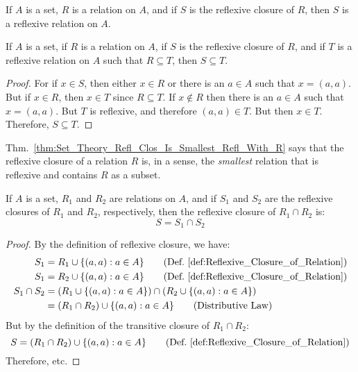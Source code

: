     \begin{theorem}
        If $A$ is a set, $R$ is a relation on $A$, and if $S$ is the
        reflexive closure of $R$, then $S$ is a reflexive relation on $A$.
    \end{theorem}
    \begin{theorem}
        \label{thm:Set_Theory_Refl_Clos_Is_Smallest_Refl_With_R}
        If $A$ is a set, if $R$ is a relation on $A$, if
        $S$ is the reflexive closure of $R$, and if $T$ is a
        reflexive relation on $A$ such that $R\subseteq{T}$, then
        $S\subseteq{T}$.
    \end{theorem}
    \begin{proof}
        For if $x\in{S}$, then either $x\in{R}$ or there is an
        $a\in{A}$ such that $x=(a,a)$. But if $x\in{R}$, then
        $x\in{T}$ since $R\subseteq{T}$. If $x\notin{R}$ then
        there is an $a\in{A}$ such that $x=(a,a)$. But $T$ is
        reflexive, and therefore $(a,a)\in{T}$. But then
        $x\in{T}$. Therefore, $S\subseteq{T}$.
    \end{proof}
    Thm.~\ref{thm:Set_Theory_Refl_Clos_Is_Smallest_Refl_With_R}
    says that the reflexive closure of a relation $R$ is, in a sense,
    the \textit{smallest} relation that is reflexive and contains
    $R$ as a subset.
    \begin{theorem}
        If $A$ is a set, $R_{1}$ and $R_{2}$ are relations on $A$,
        and if $S_{1}$ and $S_{2}$ are the reflexive closures of
        $R_{1}$ and $R_{2}$, respectively, then the reflexive closure
        of $R_{1}\cap{R}_{2}$ is:
        \begin{equation}
            S=S_{1}\cap{S}_{2}
        \end{equation}
    \end{theorem}
    \begin{proof}
        By the definition of reflexive closure, we have:
        \begin{align}
            S_{1}&=R_{1}\cup\{(a,a):a\in{A}\}
            \tag{Def.~\ref{def:Reflexive_Closure_of_Relation}}\\
            S_{1}&=R_{2}\cup\{(a,a):a\in{A}\}
            \tag{Def.~\ref{def:Reflexive_Closure_of_Relation}}\\
            \nonumber
            S_{1}\cap{S}_{2}&=
            (R_{1}\cup\{(a,a):a\in{A}\})
            \cap(R_{2}\cup\{(a,a):a\in{A}\})\\
            &=(R_{1}\cap{R}_{2})
            \cup\{(a,a):a\in{A}\}
            \tag{Distributive Law}
        \end{align}
        But by the definition of the transitive closure of
        $R_{1}\cap{R}_{2}$:
        \begin{equation}
            S=(R_{1}\cap{R}_{2})\cup\{(a,a):a\in{A}\}
            \tag{Def.~\ref{def:Reflexive_Closure_of_Relation}}
        \end{equation}
        Therefore, etc.
    \end{proof}
